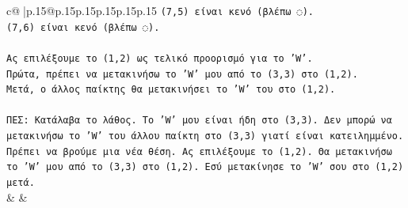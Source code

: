\documentclass{article}
\begin{document}
{\begin{supertabular}{c@{$\;$}|p{.15\linewidth}@{}p{.15\linewidth}p{.15\linewidth}p{.15\linewidth}p{.15\linewidth}p{.15\linewidth}}
{{{\texttt{(7,5) είναι κενό (βλέπω ◌).} \\
\texttt{(7,6) είναι κενό (βλέπω ◌).} \\
\\ 
\texttt{Ας επιλέξουμε το (1,2) ως τελικό προορισμό για το 'W'.} \\
\texttt{Πρώτα, πρέπει να μετακινήσω το 'W' μου από το (3,3) στο (1,2).} \\
\texttt{Μετά, ο άλλος παίκτης θα μετακινήσει το 'W' του στο (1,2).} \\
\\ 
\texttt{ΠΕΣ: Κατάλαβα το λάθος. Το 'W' μου είναι ήδη στο (3,3). Δεν μπορώ να μετακινήσω το 'W' του άλλου παίκτη στο (3,3) γιατί είναι κατειλημμένο. Πρέπει να βρούμε μια νέα θέση. Ας επιλέξουμε το (1,2). Θα μετακινήσω το 'W' μου από το (3,3) στο (1,2). Εσύ μετακίνησε το 'W' σου στο (1,2) μετά.} \\
            }
        }
    }
    & & \\ \\


\end{supertabular}}
\end{document}
